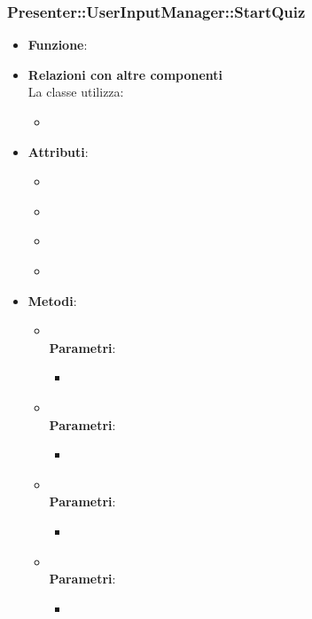\subsubsection{Presenter::UserInputManager::StartQuiz}
\begin{itemize}
\item\textbf{Funzione}:
\item\textbf{Relazioni con altre componenti}\\
La classe utilizza:
	\begin{itemize}
		\item
	\end{itemize}
\item\textbf{Attributi}:
	\begin{itemize}
		\item\code{}\\
		\item\code{}\\
		\item\code{}\\
		\item\code{}\\
	\end{itemize}
\item\textbf{Metodi}:
	\begin{itemize}
		\item\code{}\\
		\textbf{Parametri}:
			\begin{itemize}
				\item\code{}\\
			\end{itemize}
		\item\code{}\\
		\textbf{Parametri}:
			\begin{itemize}
				\item\code{}\\
			\end{itemize}
		\item\code{}\\
		\textbf{Parametri}:
			\begin{itemize}
				\item\code{}\\
			\end{itemize}
		\item\code{}\\
		\textbf{Parametri}:
			\begin{itemize}
				\item\code{}\\
			\end{itemize}
	\end{itemize}
\end{itemize}

